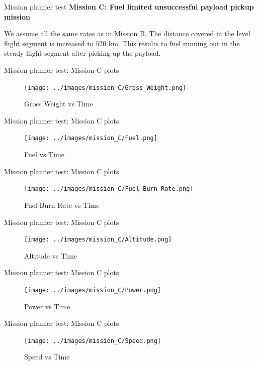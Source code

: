 \documentclass{beamer}
\begin{document}
\begin{frame}{Mission planner test}
  \textbf{Mission C: Fuel limited unsuccessful payload pickup mission}

  We assume all the same rates as in Mission B. The distance covered in the level flight segment is increased to $520$ km. This results to fuel running out in the steady flight segment after picking up the payload.

\end{frame}

\begin{frame}{Mission planner test: Mission C plots}
  \begin{figure}
    \centering
    \texttt{[image: ../images/mission\_C/Gross\_Weight.png]}
    \caption{Gross Weight vs Time}
  \end{figure}
\end{frame}

\begin{frame}{Mission planner test: Mission C plots}
  \begin{figure}
    \centering
    \texttt{[image: ../images/mission\_C/Fuel.png]}
    \caption{Fuel vs Time}
  \end{figure}
\end{frame}

\begin{frame}{Mission planner test: Mission C plots}
  \begin{figure}
    \centering
    \texttt{[image: ../images/mission\_C/Fuel\_Burn\_Rate.png]}
    \caption{Fuel Burn Rate vs Time}
  \end{figure}
\end{frame}

\begin{frame}{Mission planner test: Mission C plots}
  \begin{figure}
    \centering
    \texttt{[image: ../images/mission\_C/Altitude.png]}
    \caption{Altitude vs Time}
  \end{figure}

\end{frame}

\begin{frame}{Mission planner test: Mission C plots}
  \begin{figure}
    \centering
    \texttt{[image: ../images/mission\_C/Power.png]}
    \caption{Power vs Time}
  \end{figure}
\end{frame}

\begin{frame}{Mission planner test: Mission C plots}
  \begin{figure}
    \centering
    \texttt{[image: ../images/mission\_C/Speed.png]}
    \caption{Speed vs Time}
  \end{figure}
\end{frame}
\end{document}
